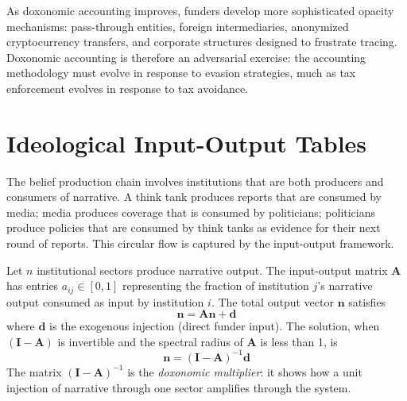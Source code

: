 \begin{remark}
\label{rem:opacity-arms-race}
As doxonomic accounting improves, funders develop more sophisticated opacity mechanisms: pass-through entities, foreign intermediaries, anonymized cryptocurrency transfers, and corporate structures designed to frustrate tracing.
Doxonomic accounting is therefore an adversarial exercise: the accounting methodology must evolve in response to evasion strategies, much as tax enforcement evolves in response to tax avoidance.
\end{remark}


\section{Ideological Input-Output Tables}
\label{sec:ch14-leontief}

The belief production chain involves institutions that are both producers and consumers of narrative.
A think tank produces reports that are consumed by media; media produces coverage that is consumed by politicians; politicians produce policies that are consumed by think tanks as evidence for their next round of reports.
This circular flow is captured by the input-output framework.

\begin{model}
\label{mod:io-table}
Let $n$ institutional sectors produce narrative output.
The input-output matrix $\bm{A}$ has entries $a_{ij} \in [0,1]$ representing the fraction of institution $j$'s narrative output consumed as input by institution $i$.
The total output vector $\bm{n}$ satisfies
\[
  \bm{n} = \bm{A}\bm{n} + \bm{d}
\]
where $\bm{d}$ is the exogenous injection (direct funder input).
The solution, when $(\bm{I} - \bm{A})$ is invertible and the spectral radius of $\bm{A}$ is less than 1, is
\[
  \bm{n} = (\bm{I} - \bm{A})^{-1}\bm{d}
\]
The matrix $(\bm{I} - \bm{A})^{-1}$ is the \emph{doxonomic multiplier}: it shows how a unit injection of narrative through one sector amplifies through the system.
\end{model}


